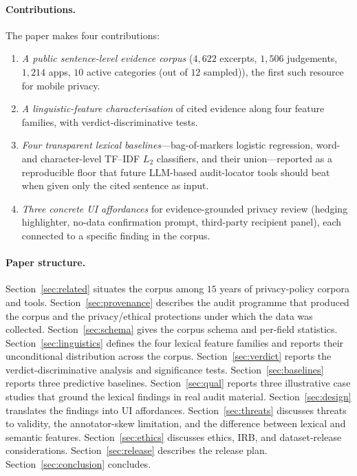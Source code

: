 \documentclass[11pt,a4paper]{article}
\begin{document}
\paragraph{Contributions.}
The paper makes four contributions:
\begin{enumerate}[label=\textbf{C\arabic*.},leftmargin=*,itemsep=2pt,topsep=2pt]
\item \emph{A public sentence-level evidence corpus} ($4{,}622$
excerpts, $1{,}506$ judgements, $1{,}214$ apps, $10$ active categories (out of $12$ sampled)), the
first such resource for mobile privacy.
\item \emph{A linguistic-feature characterisation} of cited evidence
along four feature families, with verdict-discriminative tests.
\item \emph{Four transparent lexical baselines}---bag-of-markers
logistic regression, word- and character-level TF--IDF $L_2$
classifiers, and their union---reported as a reproducible floor that
future LLM-based audit-locator tools should beat when given only the
cited sentence as input.
\item \emph{Three concrete UI affordances} for evidence-grounded
privacy review (hedging highlighter, no-data confirmation prompt,
third-party recipient panel), each connected to a specific finding in
the corpus.
\end{enumerate}

\paragraph{Paper structure.}
Section~\ref{sec:related} situates the corpus among $15$ years of
privacy-policy corpora and tools.
Section~\ref{sec:provenance} describes the audit programme that
produced the corpus and the privacy/ethical protections under which
the data was collected.
Section~\ref{sec:schema} gives the corpus schema and per-field
statistics.
Section~\ref{sec:linguistics} defines the four lexical feature
families and reports their unconditional distribution across the
corpus.
Section~\ref{sec:verdict} reports the verdict-discriminative analysis
and significance tests.
Section~\ref{sec:baselines} reports three predictive baselines.
Section~\ref{sec:qual} reports three illustrative case studies that
ground the lexical findings in real audit material.
Section~\ref{sec:design} translates the findings into UI affordances.
Section~\ref{sec:threats} discusses threats to validity, the
annotator-skew limitation, and the difference between lexical and
semantic features.
Section~\ref{sec:ethics} discusses ethics, IRB, and dataset-release
considerations.
Section~\ref{sec:release} describes the release plan.
Section~\ref{sec:conclusion} concludes.
\end{document}
